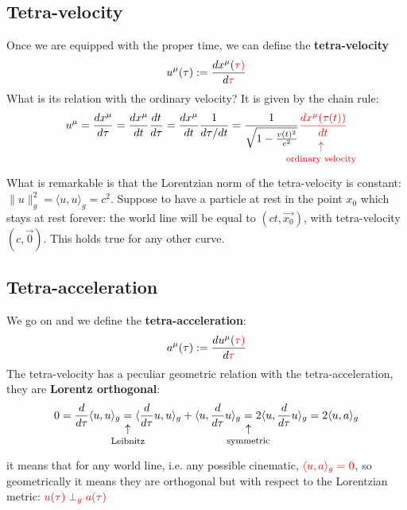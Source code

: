 \documentclass[../main.tex]{subfiles}
\begin{document}
\subsection{Tetra-velocity}
Once we are equipped with the proper time, we can define the \textbf{tetra-velocity}
\[
u^{\mu}(\tau):=\frac{dx^{\mu}(\color{red}\tau)}{d\color{red}\tau}
\]
What is its relation with the ordinary velocity? It is given by the chain rule:
\[
u^{\mu}=\frac{dx^{\mu}}{d\tau}=\frac{dx^{\mu}}{dt}\frac{dt}{d\tau}=\frac{dx^{\mu}}{dt}\frac{1}{d\tau/dt}=\frac{1}{\sqrt{1-\frac{v(t)^2}{c^2}}}{\color{red}\frac{dx^{\mu}(\tau(t))}{\underset{\mathclap{\tikz \node {$\uparrow$} node [below=1ex] {\footnotesize ordinary velocity };}}dt}}
\]
What is remarkable is that the Lorentzian norm of the tetra-velocity is constant: $\rVert u \rVert^2_g=\langle u,u \rangle_g=c^2$. Suppose to have a particle at rest in the point $x_0$ which stays at rest forever: the world line will be equal to $(ct,\Vec{x_0})$, with tetra-velocity $(c,\Vec{0})$. This holds true for any other curve.
\subsection{Tetra-acceleration}
We go on and we define the \textbf{tetra-acceleration}:
\[
a^{\mu}(\tau):=\frac{du^{\mu}(\color{red}\tau)}{d\color{red}\tau}
\]
The tetra-velocity has a peculiar geometric relation with the tetra-acceleration, they are \textbf{Lorentz orthogonal}:
\[
0=\frac{d}{d\tau}\langle u,u \rangle_g\underset{\mathclap{\tikz \node {$\uparrow$} node [below=1ex] {\footnotesize Leibnitz };}}=\langle\frac{d}{d\tau}u,u\rangle_g+\langle u,\frac{d}{d\tau}u\rangle_g\underset{\mathclap{\tikz \node {$\uparrow$} node [below=1ex] {\footnotesize symmetric};}}=2\langle u,\frac{d}{d\tau}u\rangle_g=2\langle u,a \rangle_g
\]
it means that for any world line, i.e. any possible cinematic, ${\color{red}\langle u,a \rangle_g=0}$, so geometrically it means they are orthogonal but with respect to the Lorentzian metric: ${\color{red}u(\tau)\perp_g a(\tau)}$
\end{document}
